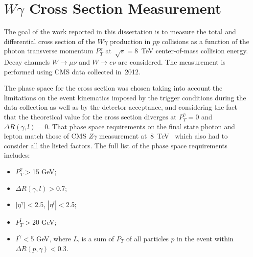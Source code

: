 \chapter{$W\gamma$ Cross Section Measurement}
\label{sec:AN_WgMeas}

The goal of the work reported in this dissertation is to measure the total and differential cross section of the $W\gamma$ production in $pp$ collisions as a function of the photon transverse momentum $P_T^\gamma$ at~$\sqrt{s}=$8~TeV center-of-mass collision energy. Decay channels $W\rightarrow\mu\nu$ and $W\rightarrow e\nu$ are considered. The measurement is performed using CMS data collected in~2012.

The phase space for the cross section was chosen taking into account the limitations on the event kinematics imposed by the trigger conditions during the data collection as well as by the detector acceptance, and considering the fact that the theoretical value for the cross section diverges at $P_T^{\gamma}=$0 and $\Delta{R}(\gamma,l)=$0. That phase space requirements on the final state photon and lepton match those of CMS $Z\gamma$ measurement at~8~TeV~\cite{ref_Zg8TeV} which also had to consider all the listed factors. The full list of the phase space requirements includes:
\begin{itemize}
  \item $P_T^{\gamma}>$15 GeV;
  \item $\Delta{R}(\gamma,l) > $0.7;
  \item $|\eta^{\gamma}|<$2.5, $|\eta^{l}|<$2.5;
  \item $P_T^{l}>$20 GeV;
  \item $I^{\gamma}<$5 GeV, where $I_{\gamma}$ is a sum of $P_T$ of all particles $p$ in the event within $\Delta{R(p,\gamma)}<$0.3.
\end{itemize}
